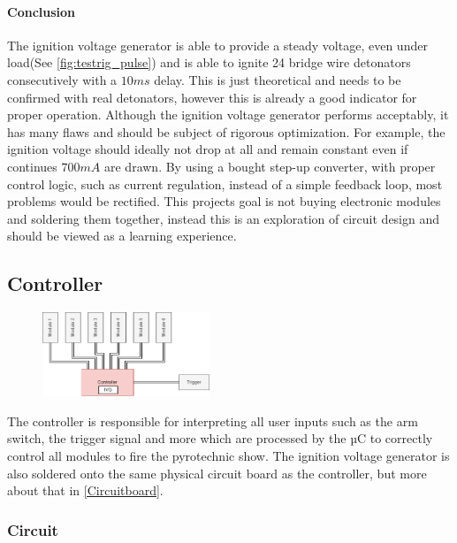 \paragraph{Conclusion}
The ignition voltage generator is able to provide a steady voltage, even under load(See \cref{fig:testrig_pulse}) and is able to ignite 24 bridge wire detonators consecutively with a $10ms$ delay. This is just theoretical and needs to be confirmed with real detonators, however this is already a good indicator for proper operation. Although the ignition voltage generator performs acceptably, it has many flaws and should be subject of rigorous optimization. For example, the ignition voltage should ideally not drop at all and remain constant even if continues $700mA$ are drawn. By using a bought step-up converter, with proper control logic, such as current regulation, instead of a simple feedback loop, most problems would be rectified. This projects goal is not buying electronic modules and soldering them together, instead this is an exploration of circuit design and should be viewed as a learning experience.


\pagebreak


\subsection{Controller}
\label{Controller}

\begin{figure}[!ht]
    \centering
    \includegraphics[width=5cm]{./Figures/concept_controller.png} 
\end{figure}

\noindent The controller is responsible for interpreting all user inputs such as the arm switch, the trigger signal and more which are processed by the µC to correctly control all modules to fire the pyrotechnic show. The ignition voltage generator is also soldered onto the same physical circuit board as the controller, but more about that in \cref{Circuitboard}.

\subsubsection{Circuit}
\label{Ctrlcircuit}

